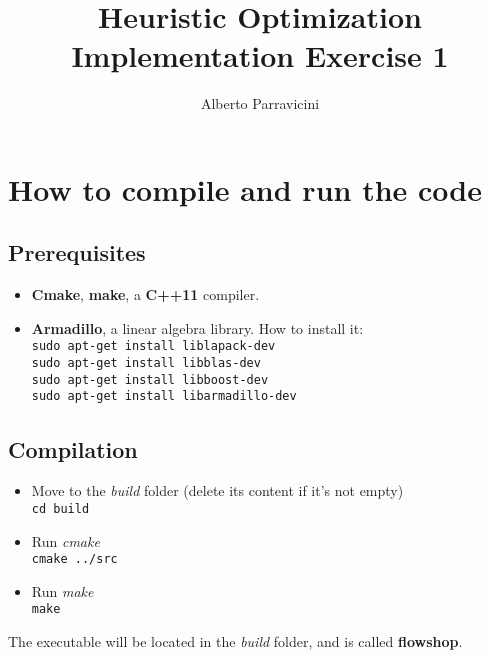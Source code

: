 \documentclass[
12pt,
a4paper,
oneside,
headinclude,
footinclude]{article}
\title{\textbf{Heuristic Optimization \\ Implementation Exercise 1}}
\author{{Alberto Parravicini}}
\date{}	%
\theoremstyle{definition} %
\begin{document}
\maketitle
{}
\setcounter{page}{1}






\section{How to compile and run the code}
\subsection{\textbf{Prerequisites}}
\begin{itemize}
    \item \textbf{Cmake}, \textbf{make}, a \textbf{C++11} compiler.
    \item \textbf{Armadillo}, a linear algebra library. How to install it:\\
        \-\quad\texttt{sudo apt-get install liblapack-dev}\\
        \-\quad\texttt{sudo apt-get install libblas-dev}\\
        \-\quad\texttt{sudo apt-get install libboost-dev}\\
        
        \quad\texttt{sudo apt-get install libarmadillo-dev}
\end{itemize}
\subsection{\textbf{Compilation}}
\begin{itemize}
   \item Move to the \textit{build} folder (delete its content if it's not empty)\\
    \-\quad\texttt{cd build}
   \item Run \textit{cmake}\\
    \-\quad\texttt{cmake ../src}
   \item Run \textit{make}\\
    \-\quad\texttt{make}
\end{itemize}

The executable will be located in the \textit{build} folder, and is called \textbf{flowshop}.
\end{document}
